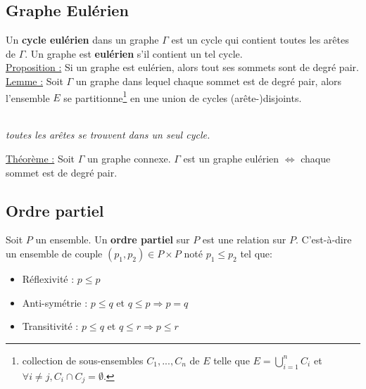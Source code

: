 \documentclass[11pt]{article}
\begin{document}
	\subsection{Graphe Eulérien}
		Un \textbf{cycle eulérien} dans un graphe $\Gamma$ est un cycle qui contient toutes les arêtes de $\Gamma$. Un graphe est \textbf{eulérien} s'il contient un tel cycle.\\
		
		\underline{Proposition :} Si un graphe est eulérien, alors tout ses sommets sont de degré pair.\\
		
		\underline{Lemme :} Soit $\Gamma$ un graphe dans lequel chaque sommet est de degré pair, alors l'ensemble $E$ se partitionne\footnote{collection de sous-ensembles $C_1, ..., C_n$ de $E$ telle que $E=\displaystyle\bigcup^n_{i=1} C_i$ et $\forall i \neq j, C_i \cap C_j = \emptyset$.} en une union de cycles (arête-)disjoints.\\
		\begin{center}
			 \\
				\textit{toutes les arêtes se trouvent dans un seul cycle.}
			\end{center} 
			
	\underline{Théorème :}  Soit $\Gamma$ un graphe connexe. $\Gamma$ est un graphe eulérien $\Leftrightarrow$ chaque sommet est de degré pair.
	\subsection{Ordre partiel}
		Soit $P$ un ensemble. Un \textbf{ordre partiel} sur $P$ est une relation sur $P$. C'est-à-dire un ensemble de couple $(p_1,p_2) \in P \times P$ noté $p_1 \leq p_2$ tel que:
		\begin{itemize}
			\item Réflexivité : $p \leq p$
			\item Anti-symétrie : $p \leq q$ et $q \leq p \Rightarrow p = q$
			\item Transitivité : $p \leq q$ et $q \leq r \Rightarrow p \leq r$
		\end{itemize}
\end{document}
